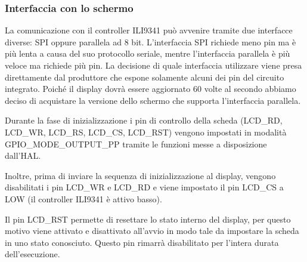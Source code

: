 \documentclass[a4paper]{article}
\begin{document}
%
%

\subsubsection{Interfaccia con lo schermo}

La comunicazione con il controller ILI9341 può avvenire tramite due interfacce diverse:
SPI oppure parallela ad 8 bit. L'interfaccia SPI richiede meno pin ma è più lenta
a causa del suo protocollo seriale, mentre l'interfaccia parallela è più veloce ma
richiede più pin. La decisione di quale interfaccia utilizzare viene presa direttamente
dal produttore che espone solamente alcuni dei pin del circuito integrato. Poiché il display
dovrà essere aggiornato 60 volte al secondo abbiamo deciso di acquistare la versione dello
schermo che supporta l'interfaccia parallela.

Durante la fase di inizializzazione i pin di controllo della scheda
(LCD\_RD, LCD\_WR, LCD\_RS, LCD\_CS, LCD\_RST) vengono impostati in modalità
GPIO\_MODE\_OUTPUT\_PP tramite le funzioni messe a disposizione dall'HAL.

Inoltre, prima di inviare la sequenza di inizializzazione al display, vengono disabilitati i pin
LCD\_WR e LCD\_RD e viene impostato il pin LCD\_CS a LOW (il controller ILI9341 è attivo basso).

Il pin LCD\_RST permette di resettare lo stato interno del display, per questo
motivo viene attivato e disattivato all'avvio in modo tale da impostare la scheda in uno
stato conosciuto. Questo pin rimarrà disabilitato per l'intera durata dell'esecuzione.
\end{document}
